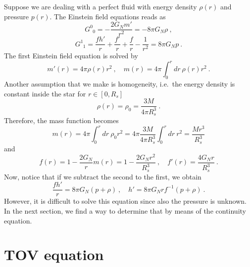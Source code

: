     Suppose we are dealing with a perfect fluid with energy density $\rho (r)$ and pressure $p(r)$. The Einstein field equations reads as
    \begin{equation*}
        G^0_{\phantom 00} = - \frac{2 G_N m'}{r^2} = - 8 \pi G_N \rho ~,
    \end{equation*}
    \begin{equation*}
        G^1_{\phantom 11} = \frac{f h'}{r} + \frac{f'}{r} +\frac{f}{r} - \frac{1}{r^2} = 8 \pi G_N p ~.
    \end{equation*}
    The first Einstein field equation is solved by
    \begin{equation*}
        m'(r) = 4 \pi \rho (r) r^2 ~, \quad m(r) = 4 \pi \int_0^r dr ~ \rho (r) r^2 ~.
    \end{equation*}
    Another assumption that we make is homogeneity, i.e.~the energy density is constant inside the star for $r \in [0, R_s]$
    \begin{equation*}
        \rho (r) = \rho_0 = \frac{3 M}{4 \pi R_s^3} ~.
    \end{equation*}
    Therefore, the mass function becomes 
    \begin{equation*}
        m(r) = 4 \pi \int_0^r dr ~ \rho_0 r^2 = 4 \pi \frac{3 M}{4 \pi R_s^3} \int_0^r dr ~ r^2 = \frac{M r^3 }{R_s^3} 
    \end{equation*}
    and 
    \begin{equation*}
        f(r) = 1 - \frac{2 G_N}{r} m(r) = 1 - \frac{2 G_N r^2}{R_s^3} ~, \quad f' (r) = \frac{4 G_N r}{R_s^3} ~.
    \end{equation*}
    Now, notice that if we subtract the second to the first, we obtain
    \begin{equation*}
        \frac{f h'}{r} = 8 \pi G_N (p + \rho) ~, \quad h' = 8 \pi G_N r f^{-1} (p + \rho) ~.
    \end{equation*}
    However, it is difficult to solve this equation since also the pressure is unknown. In the next section, we find a way to determine that by means of the continuity equation.

\section{TOV equation} 

